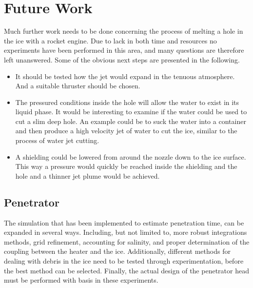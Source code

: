 \chapter{Future Work}


Much further work needs to be done concerning the process of melting a hole in the ice with a rocket engine. Due to lack in both time and resources no experiments have been performed in this area, and many questions are therefore left unanswered. Some of the obvious next steps are presented in the following.
\begin{itemize}
\item It should be tested how the jet would expand in the tenuous atmosphere. And a suitable thruster should be chosen.

\item The pressured conditions inside the hole will allow the water to exist in its liquid phase. It would be interesting to examine if the water could be used to cut a slim deep hole. An example could be to suck the water into a container and then produce a high velocity jet of water to cut the ice, similar to the process of water jet cutting.

\item A shielding could be lowered from around the nozzle down to the ice surface. This way a pressure would quickly be reached inside the shielding and the hole and a thinner jet plume would be achieved.
\end{itemize}

%



\section{Penetrator}
The simulation that has been implemented to estimate penetration time, can be expanded in several ways. Including, but not limited to, more robust integrations methods, grid refinement, accounting for salinity, and proper determination of the coupling between the heater and the ice. Additionally, different methods for dealing with debris in the ice need to be tested through experimentation, before the best method can be selected. Finally, the actual design of the penetrator head must be performed with basis in these experiments.


